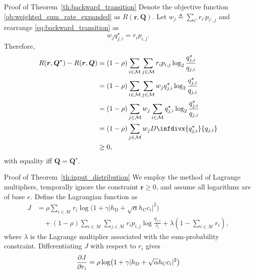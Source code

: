 \documentclass[journal]{IEEEtran}
\newcommand{\infdiv}{D\infdivx}
\begin{document}
	\begin{appendix}
		\begin{subsection}{Proof of Theorem~\ref{th:backward_transition}}
			Denote the objective function \eqref{ob:weighted_sum_rate_expanded} as $R(\boldsymbol{r}, \boldsymbol{Q})$. Let $w_j \triangleq \sum_{i'} r_{i'} p_{i', j}$ and rearrange \eqref{eq:backward_transition} as
			\begin{equation}
				w_j q_{j, i}^{\star} = r_i p_{i,j}.
			\end{equation}
			Therefore,
			\begin{align}
				R(\boldsymbol{r}, \boldsymbol{Q}^{\star}) - R(\boldsymbol{r}, \boldsymbol{Q})
				& = (1 - \rho) \sum_{i \in \mathcal{M}} \sum_{j \in \mathcal{M}} r_i p_{i,j} \log_2 \frac{q_{j, i}^{\star}}{q_{j, i}} \nonumber \\
				& = (1 - \rho) \sum_{i \in \mathcal{M}} \sum_{j \in \mathcal{M}} w_j q_{j, i}^{\star} \log_2 \frac{q_{j, i}^{\star}}{q_{j, i}} \nonumber \\
				& = (1 - \rho) \sum_{j \in \mathcal{M}} w_j \sum_{i \in \mathcal{M}} q_{j, i}^{\star} \log_2 \frac{q_{j, i}^{\star}}{q_{j, i}} \nonumber \\
				& = (1 - \rho) \sum_{j \in \mathcal{M}} w_j \infdiv{q_{j, i}^{\star}}{q_{j, i}} \nonumber \\
				& \ge 0,
			\end{align}
			with equality iff $\boldsymbol{Q} = \boldsymbol{Q}^{\star}$.
			\label{ap:backward_transition}
		\end{subsection}
		\begin{subsection}{Proof of Theorem~\ref{th:input_distribution}}
			We employ the method of Lagrange multipliers, temporally ignore the constraint $\boldsymbol{r} \ge 0$, and assume all logarithms are of base $e$. Define the Lagrangian function as
			\begin{align}
				J
				& = \rho \sum_{i \in \mathcal{M}} r_i \log \bigl( 1 + \gamma \lvert h_{\mathrm{D}} + \sqrt{\alpha} h_{\mathrm{C}} c_i \rvert^2 \bigr) \nonumber \\
				& \quad + (1 - \rho) \sum_{i \in \mathcal{M}} \sum_{j \in \mathcal{M}} r_i p_{i,j} \log \frac{q_{j, i}}{r_i} + \lambda \left( 1 - \sum_{i \in \mathcal{M}} r_i \right),
			\end{align}
			where $\lambda$ is the Lagrange multiplier associated with the sum-probability constraint. Differentiating $J$ with respect to $r_i$ gives
			\begin{align}
				\pdv{J}{r_i}
				& = \rho \log \bigl( 1 + \gamma \lvert h_{\mathrm{D}} + \sqrt{\alpha} h_{\mathrm{C}} c_i \rvert^2 \bigr) \\

\end{align}
\end{subsection}
\end{appendix}
\end{document}

